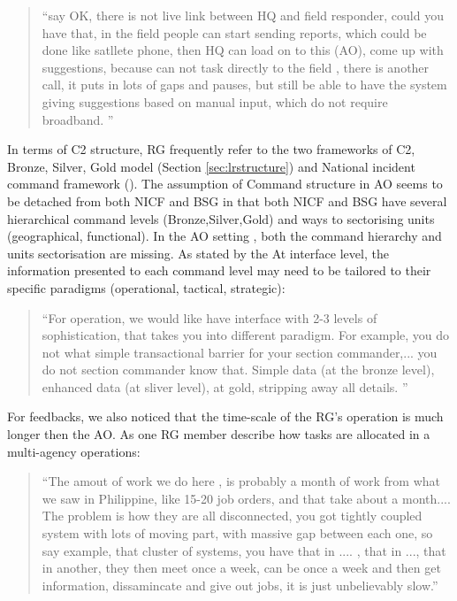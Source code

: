 \begin{quotation}
``say  OK, there is not live link between HQ and field responder, could you have that, in the field people can start sending reports, which could be done like satllete phone, then HQ can load on to this (AO), come up with suggestions, because can not task directly to the field , there is another call,  it puts in lots of gaps and pauses, but still be able to have the system giving suggestions based on manual input, which do not require broadband. ''
\end{quotation}


In terms of \acf{C2} structure, RG frequently refer to the two frameworks of \ac{C2},  Bronze, Silver, Gold model (Section \ref{sec:lrstructure}) and National incident command framework (\cite{Command2008}). The assumption of Command structure in \ac{AO} seems to be detached from both NICF and \ac{BSG} in that both NICF and \ac{BSG} have several hierarchical command levels (Bronze,Silver,Gold) and ways to sectorising units (geographical, functional).  In the \ac{AO} setting , both the command hierarchy and units sectorisation are missing. As stated by the At interface level, the information presented to each command level may need to be tailored to their specific paradigms (operational, tactical, strategic):

\begin{quotation}
``For operation, we would like have interface with 2-3 levels of sophistication, that takes you into different paradigm. For example, you do not what simple transactional barrier for your section commander,...  you do not section commander know that. Simple data (at the bronze level), enhanced data (at sliver level), at gold, stripping away all details. ''
\end{quotation}

For feedbacks, we also noticed that the time-scale of the \ac{RG}'s operation is much longer then the \ac{AO}. As one \ac{RG} member describe how tasks are allocated in a multi-agency operations: 

\begin{quotation}
``The amout of work we do here , is probably a month of work from what we saw in Philippine, like 15-20 job orders, and that take about a month.... The problem is how they are all disconnected, you got tightly coupled system with lots of moving part, with massive gap between each one, so say example, that cluster of systems, you have that in .... , that in ..., that in another, they then meet once a week, can be once a week and then get information, dissamincate and give out jobs, it is just unbelievably slow.''
\end{quotation}

